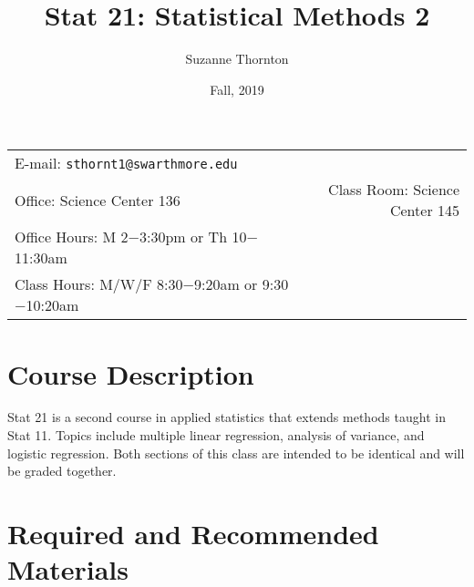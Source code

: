 \documentclass[11pt]{article}
\title{Stat 21: Statistical Methods 2}
\author{Suzanne Thornton}
\date{Fall, 2019}
\newcommand{\blankline}{\quad\pagebreak[2]}
\begin{document}
	
	\maketitle
	
	\blankline
	
	\begin{tabular*}{.93\textwidth}{@{\extracolsep{\fill}}lr}
		
		
		E-mail: \texttt{sthornt1@swarthmore.edu} & \\ %
				Office: Science Center 136 & Class Room: Science Center 145 \\
				Office Hours: M 2$-$3:30pm or Th 10$-$11:30am  &  \\
			Class Hours: M/W/F  8:30$-$9:20am or 9:30$-$10:20am  & 
	\end{tabular*}
	
	\vspace{5 mm}
	

	\section*{Course Description}

Stat 21 is a second course in applied statistics that extends methods taught in Stat 11. Topics include multiple linear regression, analysis of variance, and logistic regression. Both sections of this class are intended to be identical and will be graded together.
	

	\section*{Required and Recommended Materials}
	
\end{document}

